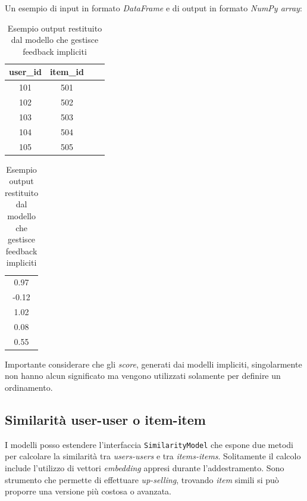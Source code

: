 Un esempio di input in formato \textit{DataFrame} e di output in formato \textit{NumPy array}:

\begin{table}[H]
    \centering
    \begin{minipage}{0.6\textwidth}
        \centering
        \begin{tabular}{|c|c|c|c|}
        \hline
        \textbf{user\_id} & \textbf{item\_id} \\
        \hline
            101 & 501 \\
            102 & 502 \\
            103 & 503 \\
            104 & 504 \\
            105 & 505 \\
        \hline
        \end{tabular}
    \end{minipage}%
    \hfill
    \begin{minipage}{0.3\textwidth}
        \centering
        \begin{tabular}{|c|}
        \hline
        0.97 \\
        -0.12 \\
        1.02 \\
        0.08 \\
        0.55 \\
        \hline
        \end{tabular}
    \end{minipage}
    \caption{Esempio output restituito dal modello che gestisce feedback impliciti}
    \label{tab:ratings_with_score}
\end{table}

Importante considerare che gli \textit{score}, generati dai modelli impliciti, singolarmente non hanno alcun significato ma vengono utilizzati solamente per definire un ordinamento.

\subsection{Similarità user-user o item-item}

I modelli posso estendere l'interfaccia \texttt{SimilarityModel} che espone due metodi per calcolare la similarità tra \textit{users-users} e tra \textit{items-items}. Solitamente il calcolo include l'utilizzo di vettori \textit{embedding} appresi durante l'addestramento. Sono strumento che permette di effettuare \textit{up-selling}, trovando \textit{item} simili si può proporre una versione più costosa o avanzata.

